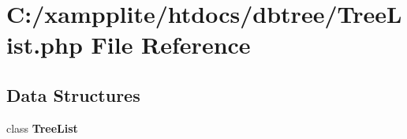 \section{C:/xampplite/htdocs/dbtree/TreeList.php File Reference}
\label{_tree_list_8php}
\subsection*{Data Structures}
\begin{DoxyCompactItemize}
\item 
class {\bf TreeList}
\end{DoxyCompactItemize}
